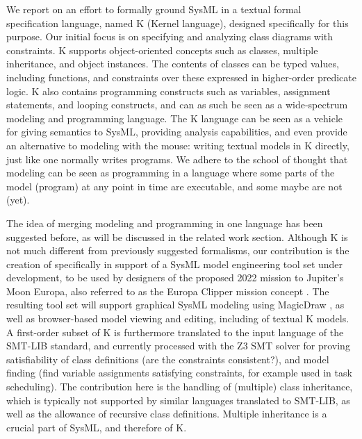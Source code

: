 We report on an effort to formally ground SysML in a textual
formal specification language, named K (Kernel language), designed
specifically for this purpose.  
Our initial focus is on specifying and analyzing class diagrams
with constraints. K supports object-oriented concepts
such as classes, multiple inheritance, and object instances. The
contents of classes can be typed values, including functions, and
constraints over these expressed in higher-order predicate logic. 
K also contains programming constructs such as
variables, assignment statements, and looping constructs, and can as
such be seen as a wide-spectrum modeling and programming language.
The K language can be seen as a vehicle for giving semantics to SysML,
providing analysis capabilities, and even provide an alternative to
modeling with the mouse: writing textual models in K directly, just
like one normally writes programs.  We adhere to the school of thought
that modeling can be seen as programming in a language where some parts of the
model (program) at any point in time are executable, and some maybe
are not (yet).

The idea of merging modeling and programming in one language has been
suggested before, as will be discussed in the related work section.
Although K is not much different from previously suggested formalisms,  
our contribution is the creation of \Klang{} specifically in support of a
SysML model engineering tool set under development, to be used by
designers of the proposed 2022 mission to Jupiter's Moon Europa, also
referred to as the Europa Clipper mission concept
\cite{europa-clipper}.  The resulting tool set will support graphical
SysML modeling using MagicDraw \cite{magicdraw}, as well as
browser-based model viewing and editing, including of textual K
models. A first-order subset of K is furthermore translated to the input language of the
SMT-LIB standard, and currently processed with the Z3 SMT solver for
proving satisfiability of class definitions (are the constraints
consistent?), and model finding (find variable assignments satisfying
constraints, for example used in task scheduling).  The contribution here is
the handling of (multiple) class inheritance, which is typically not supported
by similar languages translated to SMT-LIB, as well as the allowance
of recursive class definitions. Multiple inheritance is a crucial part
of SysML, and therefore of K.


